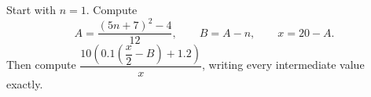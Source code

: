 Start with $n=1$. Compute
\[A=\dfrac{(5n+7)^2-4}{12},\qquad B=A-n,\qquad x=20-A.\]
Then compute $\dfrac{10(0.1(\dfrac{x}{2}-B)+1.2)}{x}$, writing every intermediate value exactly.
